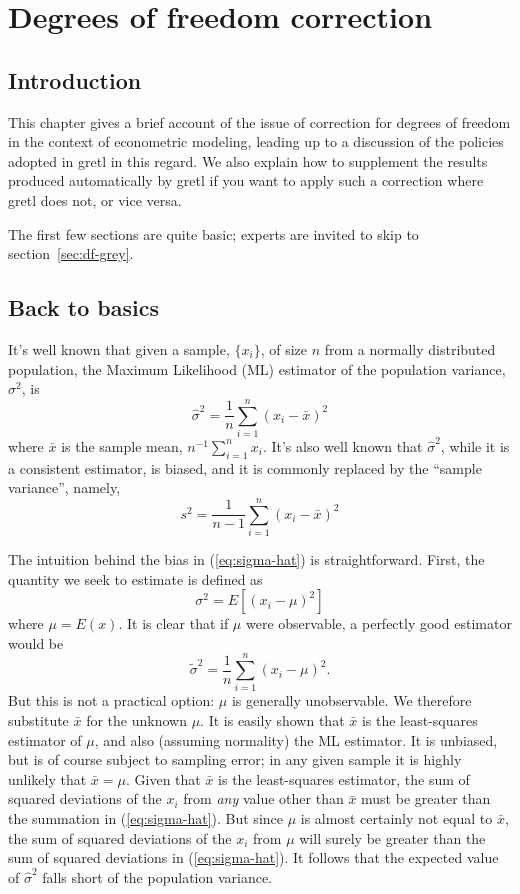 \chapter{Degrees of freedom correction}
\label{chap:df}


\section{Introduction}

This chapter gives a brief account of the issue of correction for
degrees of freedom in the context of econometric modeling, leading up
to a discussion of the policies adopted in gretl in this regard.  We
also explain how to supplement the results produced automatically by
gretl if you want to apply such a correction where gretl does not, or
vice versa.

The first few sections are quite basic; experts are invited to skip to
section~\ref{sec:df-grey}.

\section{Back to basics}
\label{sec:df-basics}

It's well known that given a sample, $\{x_i\}$, of size $n$ from a
normally distributed population, the Maximum Likelihood (ML) estimator
of the population variance, $\sigma^2$, is
%
\begin{equation}
\label{eq:sigma-hat}
\hat{\sigma}^2 = \frac{1}{n} \sum_{i=1}^n (x_i - \bar{x})^2
\end{equation}
%
where $\bar{x}$ is the sample mean, $n^{-1} \sum_{i=1}^n x_i$.  It's
also well known that $\hat{\sigma}^2$, while it is a consistent
estimator, is biased, and it is commonly replaced by the ``sample
variance'', namely,
%
\begin{equation}
\label{eq:sample-variance}
s^2 = \frac{1}{n-1} \sum_{i=1}^n (x_i - \bar{x})^2
\end{equation}

The intuition behind the bias in (\ref{eq:sigma-hat}) is
straightforward.  First, the quantity we seek to estimate is defined
as
%
\[
\sigma^2 = E\left[(x_i - \mu)^2\right]
\]
%
where $\mu = E(x)$. It is clear that if $\mu$ were observable, a
perfectly good estimator would be
%
\[
\tilde{\sigma}^2 = \frac{1}{n} \sum_{i=1}^n (x_i - \mu)^2.
\]
%
But this is not a practical option: $\mu$ is generally
unobservable. We therefore substitute $\bar{x}$ for the unknown
$\mu$. It is easily shown that $\bar{x}$ is the least-squares
estimator of $\mu$, and also (assuming normality) the ML estimator.
It is unbiased, but is of course subject to sampling error; in any
given sample it is highly unlikely that $\bar{x} = \mu$.  Given that
$\bar{x}$ is the least-squares estimator, the sum of squared
deviations of the $x_i$ from \textit{any} value other than $\bar{x}$
must be greater than the summation in (\ref{eq:sigma-hat}).  But since
$\mu$ is almost certainly not equal to $\bar{x}$, the sum of squared
deviations of the $x_i$ from $\mu$ will surely be greater than the sum
of squared deviations in (\ref{eq:sigma-hat}). It follows that the
expected value of $\hat{\sigma}^2$ falls short of the population
variance.

